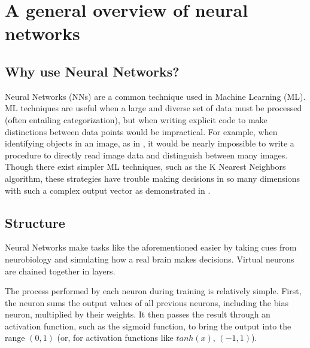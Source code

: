 \documentclass{article}
\begin{document}
\section{A general overview of neural networks}
\subsection{Why use Neural Networks?}
Neural Networks (NNs) are a common technique used in Machine Learning (ML). ML techniques are useful when a large and diverse set of data must be processed (often entailing categorization), but when writing explicit code to make distinctions between data points would be impractical. For example, when identifying objects in an image, as in \cite{hinton12}, it would be nearly impossible to write a procedure to directly read image data and distinguish between many images. Though there exist simpler ML techniques, such as the K Nearest Neighbors algorithm, these strategies have trouble making decisions in so many dimensions with such a complex output vector as demonstrated in \cite{knnic}.

\subsection{Structure}
Neural Networks make tasks like the aforementioned easier by taking cues from neurobiology and simulating how a real brain makes decisions. Virtual neurons are chained together in layers.

The process performed by each neuron during training is relatively simple. First, the neuron sums the output values of all previous neurons, including the bias neuron, multiplied by their weights. It then passes the result through an activation function, such as the sigmoid function, to bring the output into the range $(0, 1)$ (or, for activation functions like $tanh(x)$, $(-1, 1)$).
\end{document}
